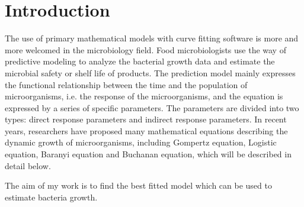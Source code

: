 \documentclass[11pt]{article}
\begin{document}
\section{Introduction}
The use of primary mathematical models with curve fitting software is more and more welcomed in the microbiology field. Food microbiologists use the way of predictive modeling to analyze the bacterial growth data and estimate the microbial safety or shelf life of products\citep{zwietering1990modeling}.
The prediction model mainly expresses the functional relationship between the time and the population of microorganisms, i.e. the response of the microorganisms, and the equation is expressed by a series of specific parameters. The parameters are divided into two types: direct response parameters and indirect response parameters. In recent years, researchers have proposed many mathematical equations describing the dynamic growth of microorganisms, including Gompertz equation, Logistic equation, Baranyi equation and Buchanan equation, which will be described in detail below.

The aim of my work is to find the best fitted model which can be used to estimate bacteria growth.
\end{document}
